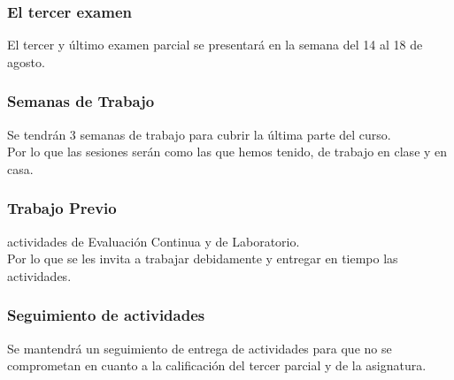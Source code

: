 \documentclass[14pt]{beamer}
\begin{document}
\begin{frame}
\frametitle{El tercer examen}
El tercer y último examen parcial se presentará en la semana del 14 al 18 de agosto.
\end{frame}
\begin{frame}
\frametitle{Semanas de Trabajo}
Se tendrán 3 semanas de trabajo para cubrir la última parte del curso.
\\
\bigskip
\pause
Por lo que las sesiones serán como las que hemos tenido, de trabajo en clase y en casa.
\end{frame}
\begin{frame}
\frametitle{Trabajo Previo}
 actividades de Evaluación Continua y de Laboratorio.
\\
\bigskip
\pause
Por lo que se les invita a trabajar debidamente y entregar en tiempo las actividades.
\end{frame}
\begin{frame}
\frametitle{Seguimiento de actividades}
Se mantendrá un seguimiento de entrega de actividades para que no se comprometan en cuanto a la calificación del tercer parcial y de la asignatura.
\end{frame}
\end{document}
